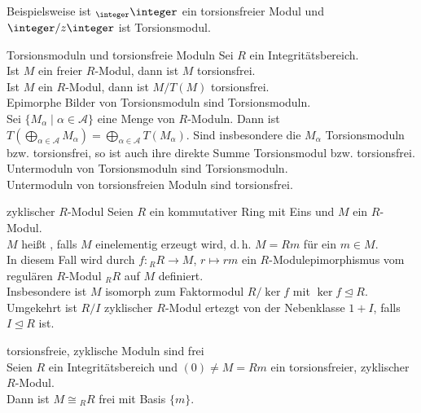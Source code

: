 \begin{Bem}
    Beispielsweise ist ${}_\integer \integer$ ein torsionsfreier Modul
    und $\integer/z\integer$ ist Torsionsmodul.
\end{Bem}

\begin{Satz}{Torsionsmoduln und torsionsfreie Moduln}
    Sei $R$ ein Integritätsbereich. \\
    Ist $M$ ein freier $R$-Modul, dann ist $M$ torsionsfrei. \\
    Ist $M$ ein $R$-Modul, dann ist $M/T(M)$ torsionsfrei. \\
    Epimorphe Bilder von Torsionsmoduln sind Torsionsmoduln. \\
    Sei $\{M_\alpha \;|\; \alpha \in \mathcal{A}\}$ eine Menge von $R$-Moduln.
    Dann ist $T\left(\bigoplus_{\alpha \in \mathcal{A}} M_\alpha\right) =
    \bigoplus_{\alpha \in \mathcal{A}} T(M_\alpha)$.
    Sind insbesondere die $M_\alpha$ Torsionsmoduln bzw. torsionsfrei,
    so ist auch ihre direkte Summe Torsionsmodul bzw. torsionsfrei. \\
    Untermoduln von Torsionsmoduln sind Torsionsmoduln. \\
    Untermoduln von torsionsfreien Moduln sind torsionsfrei.
\end{Satz}

\begin{Def}{zyklischer $R$-Modul}
    Seien $R$ ein kommutativer Ring mit Eins und $M$ ein $R$-Modul. \\
    $M$ heißt , falls
    $M$ einelementig erzeugt wird, d.\,h. $M = Rm$ für ein $m \in M$. \\
    In diesem Fall wird durch $f: {}_R R \rightarrow M$, $r \mapsto rm$
    ein $R$-Modulepimorphismus vom regulären $R$-Modul ${}_R R$ auf $M$
    definiert. \\
    Insbesondere ist $M$ isomorph zum Faktormodul $R/\ker f$ mit
    $\ker f \trianglelefteq R$. \\
    Umgekehrt ist $R/I$ zyklischer $R$-Modul ertezgt von der Nebenklasse
    $1 + I$, falls $I \trianglelefteq R$ ist.
\end{Def}

\begin{Lemma}{torsionsfreie, zyklische Moduln sind frei} \\
    Seien $R$ ein Integritätsbereich und
    $(0) \not= M = Rm$ ein torsionsfreier, zyklischer $R$-Modul. \\
    Dann ist $M \cong {}_R R$ frei mit Basis $\{m\}$.
\end{Lemma}

